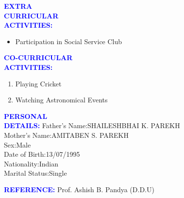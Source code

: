 \documentclass{article}
\begin{document}
\begin{flushleft}
	\textcolor{blue}{\textbf{EXTRA\\ CURRICULAR\\ ACTIVITIES:}}
	\begin{itemize}
		\vspace{-0.29in}
		\addtolength{\itemindent}{1.0in}
		\item Participation in Social Service Club 
	\end{itemize}
\end{flushleft}
\begin{flushleft}
	\textcolor{blue}{\textbf{CO-CURRICULAR\\ ACTIVITIES:}}
	\begin{enumerate}
		\vspace{-0.29in}
		\addtolength{\itemindent}{1.0in}
		\item Playing Cricket
		\item Watching Astronomical Events
	\end{enumerate}
\end{flushleft}
\begin{flushleft}
	\textcolor{blue}{\textbf{PERSONAL\\ DETAILS:}}
	\hspace{1.02in}
	Father's Name:\hspace{0.1in}SHAILESHBHAI K. PAREKH\\	
	\hspace{1.8in}
	Mother's Name:\hspace{0.06in}AMITABEN S. PAREKH\\
	\hspace{1.8in}
	Sex:\hspace{0.78in}Male\\
	\hspace{1.8in}
	Date of Birth:\hspace{0.16in}13/07/1995\\
	\hspace{1.8in}
	Nationality:\hspace{0.3in}Indian\\
	\hspace{1.8in}
	Marital Status:\hspace{0.1in}Single\\
\end{flushleft}
\begin{flushleft}
	\textcolor{blue}{\textbf{REFERENCE:}}
	\hspace{0.7in}
	Prof. Ashish B. Pandya (D.D.U)
\end{flushleft}
\end{document}
